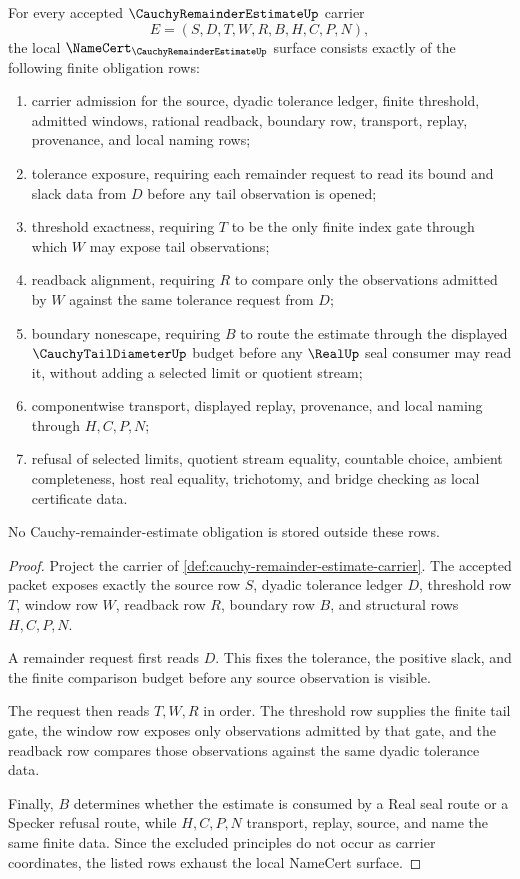 \begin{theorem}
\label{thm:cauchy-remainder-estimate-namecert-obligations}
For every accepted $\CauchyRemainderEstimateUp$ carrier
$$
E=(S,D,T,W,R,B,H,C,P,N),
$$
the local $\NameCert_{\CauchyRemainderEstimateUp}$ surface consists exactly of the following finite obligation rows:
\begin{enumerate}
\item carrier admission for the source, dyadic tolerance ledger, finite threshold, admitted windows, rational readback, boundary row, transport, replay, provenance, and local naming rows;
\item tolerance exposure, requiring each remainder request to read its bound and slack data from $D$ before any tail observation is opened;
\item threshold exactness, requiring $T$ to be the only finite index gate through which $W$ may expose tail observations;
\item readback alignment, requiring $R$ to compare only the observations admitted by $W$ against the same tolerance request from $D$;
\item boundary nonescape, requiring $B$ to route the estimate through the displayed $\CauchyTailDiameterUp$ budget before any $\RealUp$ seal consumer may read it, without adding a selected limit or quotient stream;
\item componentwise transport, displayed replay, provenance, and local naming through $H,C,P,N$;
\item refusal of selected limits, quotient stream equality, countable choice, ambient completeness, host real equality, trichotomy, and bridge checking as local certificate data.
\end{enumerate}
No Cauchy-remainder-estimate obligation is stored outside these rows.
\end{theorem}
\begin{proof}
Project the carrier of \autoref{def:cauchy-remainder-estimate-carrier}. The accepted packet exposes exactly the source row $S$, dyadic tolerance ledger $D$, threshold row $T$, window row $W$, readback row $R$, boundary row $B$, and structural rows $H,C,P,N$.

A remainder request first reads $D$. This fixes the tolerance, the positive slack, and the finite comparison budget before any source observation is visible.

The request then reads $T,W,R$ in order. The threshold row supplies the finite tail gate, the window row exposes only observations admitted by that gate, and the readback row compares those observations against the same dyadic tolerance data.

Finally, $B$ determines whether the estimate is consumed by a Real seal route or a Specker refusal route, while $H,C,P,N$ transport, replay, source, and name the same finite data. Since the excluded principles do not occur as carrier coordinates, the listed rows exhaust the local NameCert surface.
\end{proof}

